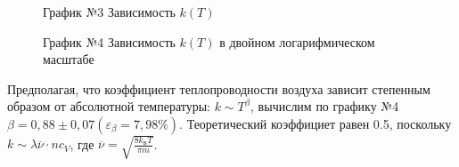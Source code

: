 \documentclass[a4paper]{article}
\begin{document}
\begin{enumerate}
\begin{figure}[h!]
\caption[]{\label{} График №3 Зависимость $k(T)$}
\end{figure}

\begin{figure}[h!]
\caption[]{\label{} График №4 Зависимость $k(T)$ в двойном логарифмическом масштабе}
\end{figure}
\clearpage
Предполагая, что коэффициент теплопроводности воздуха зависит степенным образом от абсолютной температуры: $k \sim T^\beta$, вычислим по графику №4 $\beta = 0,88 \pm 0,07 (\varepsilon_\beta = 7,98 \%)$. Теоретический коэффициет равен 0.5, поскольку $k \sim \lambda \overline{\nu} \cdot n c_V \label{k}$, где $\overline{\nu} = \sqrt{\frac{8k_{\text{Б}}T}{\pi m}}$.



\end{enumerate}
\end{document}
